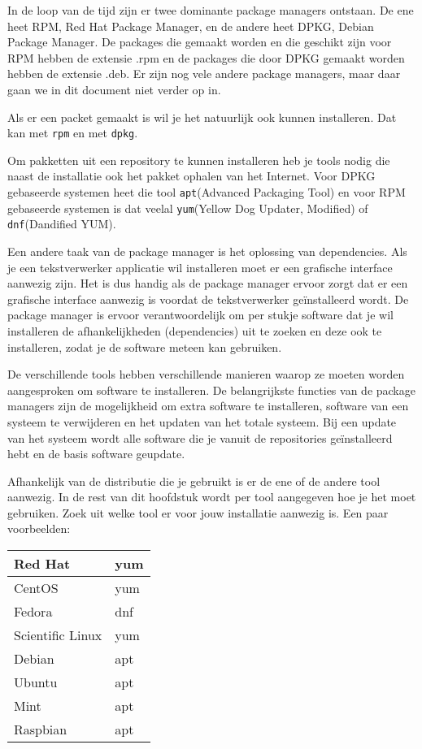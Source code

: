 In de loop van de tijd zijn er twee dominante package managers ontstaan. De ene heet RPM, Red Hat Package Manager, en de andere heet DPKG, Debian Package Manager. De packages die gemaakt worden en die geschikt zijn voor RPM hebben de extensie .rpm en de packages die door DPKG gemaakt worden hebben de extensie .deb. Er zijn nog vele andere package managers, maar daar gaan we in dit document niet verder op in.

Als er een packet gemaakt is wil je het natuurlijk ook kunnen installeren. Dat kan met \texttt{rpm} en met \texttt{dpkg}.

Om pakketten uit een repository te kunnen installeren heb je tools nodig die naast de installatie ook het pakket ophalen van het Internet. Voor DPKG gebaseerde systemen heet die tool \texttt{apt}(Advanced Packaging Tool) en voor RPM gebaseerde systemen is dat veelal \texttt{yum}(Yellow Dog Updater, Modified) of \texttt{dnf}(Dandified YUM).

Een andere taak van de package manager is het oplossing van dependencies. Als je een tekstverwerker applicatie wil installeren moet er een grafische interface aanwezig zijn. Het is dus handig als de package manager ervoor zorgt dat er een grafische interface aanwezig is voordat de tekstverwerker ge\"installeerd wordt. De package manager is ervoor verantwoordelijk om per stukje software dat je wil installeren de afhankelijkheden (dependencies) uit te zoeken en deze ook te installeren, zodat je de software meteen kan gebruiken.

De verschillende tools hebben verschillende manieren waarop ze moeten worden aangesproken om software te installeren. De belangrijkste functies van de package managers zijn de mogelijkheid om extra software te installeren, software van een systeem te verwijderen en het updaten van het totale systeem. Bij een update van het systeem wordt alle software die je vanuit de repositories ge\"installeerd hebt en de basis software geupdate.

Afhankelijk van de distributie die je gebruikt is er de ene of de andere tool aanwezig. In de rest van dit hoofdstuk wordt per tool aangegeven hoe je het moet gebruiken. Zoek uit welke tool er voor jouw installatie aanwezig is. Een paar voorbeelden:

\begin{tabular}{| l | l |}
\hline
Red Hat & yum \\
\hline
CentOS & yum \\
\hline
Fedora & dnf \\
\hline
Scientific Linux & yum \\
\hline
Debian & apt \\
\hline
Ubuntu & apt \\
\hline
Mint & apt \\
\hline
Raspbian & apt \\
\hline
\end{tabular}

